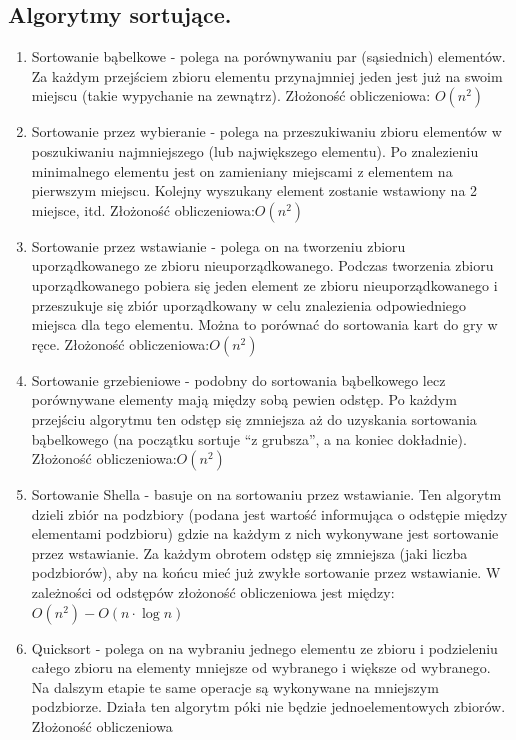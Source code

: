 \documentclass[a4paper,12pt,oneside]{book}
\begin{document}
			\subsection{Algorytmy sortujące.}
				\begin{enumerate}
					\item Sortowanie bąbelkowe - polega na porównywaniu par (sąsiednich) elementów. Za
					każdym przejściem zbioru elementu przynajmniej jeden jest już na swoim miejscu
					(takie wypychanie na zewnątrz). Złożoność obliczeniowa: $O(n^2)$
					\item Sortowanie przez wybieranie - polega na przeszukiwaniu zbioru elementów w
					poszukiwaniu najmniejszego (lub największego elementu). Po znalezieniu
					minimalnego elementu jest on zamieniany miejscami z elementem na pierwszym
					miejscu. Kolejny wyszukany element zostanie wstawiony na 2 miejsce, itd. Złożoność
					obliczeniowa:$O(n^2)$
					\item Sortowanie przez wstawianie - polega on na tworzeniu zbioru uporządkowanego ze
					zbioru nieuporządkowanego. Podczas tworzenia zbioru uporządkowanego pobiera
					się jeden element ze zbioru nieuporządkowanego i przeszukuje się zbiór
					uporządkowany w celu znalezienia odpowiedniego miejsca dla tego elementu.
					Można to porównać do sortowania kart do gry w ręce. Złożoność obliczeniowa:$O(n^2)$
					\item Sortowanie grzebieniowe - podobny do sortowania bąbelkowego lecz
					porównywane elementy mają między sobą pewien odstęp. Po każdym przejściu
					algorytmu ten odstęp się zmniejsza aż do uzyskania sortowania bąbelkowego (na
					początku sortuje “z grubsza”, a na koniec dokładnie). Złożoność obliczeniowa:$O(n^2)$
					\item Sortowanie Shella - basuje on na sortowaniu przez wstawianie. Ten algorytm dzieli
					zbiór na podzbiory (podana jest wartość informująca o odstępie między elementami
					podzbioru) gdzie na każdym z nich wykonywane jest sortowanie przez wstawianie.
					Za każdym obrotem odstęp się zmniejsza (jaki liczba podzbiorów), aby na końcu
					mieć już zwykłe sortowanie przez wstawianie. W zależności od odstępów złożoność
					obliczeniowa jest między:$O(n^2) - O(n\cdot\log n)$
					\item Quicksort - polega on na wybraniu jednego elementu ze zbioru i podzieleniu całego
					zbioru na elementy mniejsze od wybranego i większe od wybranego. Na dalszym
					etapie te same operacje są wykonywane na mniejszym podzbiorze. Działa ten
					algorytm póki nie będzie jednoelementowych zbiorów. Złożoność obliczeniowa

\end{enumerate}
\end{document}

